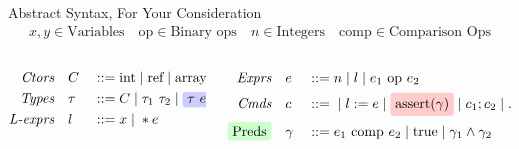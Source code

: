 \documentclass[aspectratio=169]{beamer}
\begin{document}
\begin{frame}{Abstract Syntax, For Your Consideration}
\begin{gather*}
    x,y \in \text{Variables}
    \quad
    \text{op} \in \text{Binary ops}
    \quad
    n \in \text{Integers}
    \quad
    \text{comp} \in \text{Comparison Ops}
\end{gather*}

\vspace{0.2in}

\begin{columns}[T]
\begin{column}{0.45\textwidth}
\begin{alignat*}{2}
\textit{Ctors}\quad &C &&::= \text{int} \altm \text{ref} \altm \text{array}
\\
\textit{Types}\quad &\tau &&::= C \altm \tau_1 \ \tau_2 \altm \colorIt{blue}{n1}{\tau\ e}
\\
\textit{L-exprs} \quad &l &&::= x \altm *e
\end{alignat*}
\end{column}

\pause

\begin{column}{0.45\textwidth}
\begin{alignat*}{2}
\textit{Exprs}\quad &e &&::= n \altm l \altm e_1 \text{ op } e_2
\\
\textit{Cmds}\quad &c &&::= \altm l := e \altm \colorIt{red}{n2}{\text{assert}(\gamma)} \altm c_1;c_2 \altm ...
\\
\colorIt{green}{n3}{\text{Preds}} \quad &\gamma &&::= e_1 \text{ comp } e_2 \altm \text{true} \altm \gamma_1 \wedge \gamma_2
\end{alignat*}
\end{column}
\end{columns}

\vspace{0.1in}
\end{frame}

\end{document}
